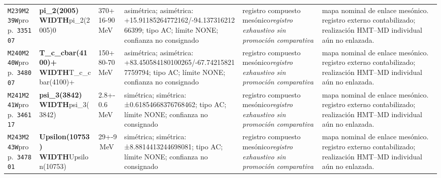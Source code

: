 \begin{landscape}
\begin{longtable}{L{1.85cm}L{4.45cm}L{2.35cm}L{4.05cm}L{3.35cm}L{7.15cm}}
\texttt{M239}\newline \texttt{M239W}\newline prop.\ \texttt{335107} & \textbf{pi\_\allowbreak{}2(2005) WIDTH}\newline pi\_\allowbreak{}2(2005)0 & 370+16-90\,MeV & asimétrica; asimétrica: +15.91185264772162/-94.13731621266399; tipo AC; límite NONE; confianza no consignado & registro compuesto mesónico\newline \emph{registro exhaustivo sin promoción comparativa} & mapa nominal de enlace mesónico. registro externo contabilizado; realización HMT--MD individual aún no enlazada. \\
\texttt{M240}\newline \texttt{M240W}\newline prop.\ \texttt{348007} & \textbf{T\_\allowbreak{}c\_\allowbreak{}cbar(4100)+ WIDTH}\newline T\_\allowbreak{}c\_\allowbreak{}cbar(4100)+ & 150+80-70\,MeV & asimétrica; asimétrica: +83.450584180100265/-67.742158217759794; tipo AC; límite NONE; confianza no consignado & registro compuesto mesónico\newline \emph{registro exhaustivo sin promoción comparativa} & mapa nominal de enlace mesónico. registro externo contabilizado; realización HMT--MD individual aún no enlazada. \\
\texttt{M241}\newline \texttt{M241W}\newline prop.\ \texttt{346117} & \textbf{psi\_\allowbreak{}3(3842) WIDTH}\newline psi\_\allowbreak{}3(3842) & 2.8+-0.6\,MeV & simétrica; simétrica: ±0.61854668376768462; tipo AC; límite NONE; confianza no consignado & registro compuesto mesónico\newline \emph{registro exhaustivo sin promoción comparativa} & mapa nominal de enlace mesónico. registro externo contabilizado; realización HMT--MD individual aún no enlazada. \\
\texttt{M243}\newline \texttt{M243W}\newline prop.\ \texttt{347801} & \textbf{Upsilon(10753) WIDTH}\newline Upsilon(10753) & 29+-9\,MeV & simétrica; simétrica: ±8.8814413244698081; tipo AC; límite NONE; confianza no consignado & registro compuesto mesónico\newline \emph{registro exhaustivo sin promoción comparativa} & mapa nominal de enlace mesónico. registro externo contabilizado; realización HMT--MD individual aún no enlazada. \\

\end{longtable}
\end{landscape}
